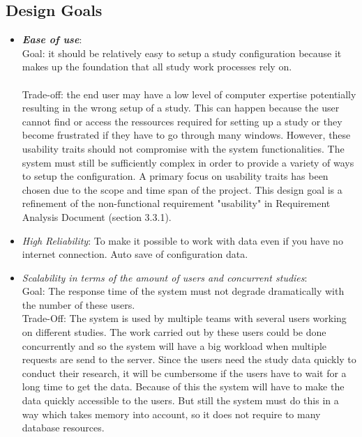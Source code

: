 \subsection{Design Goals}

\begin{itemize}
\item \textit{\bf{Ease of use}}: 
\\
Goal: it should be relatively easy to setup a study configuration because it makes up the foundation that all study work processes rely on. 
\\\\
Trade-off: the end user may have a low level of computer expertise potentially resulting in the wrong setup of a study.  This can happen because the user cannot find or access the ressources required for setting up a study or they become frustrated if they have to go through many windows. However, these usability traits should not compromise with the system functionalities. The system must still be sufficiently complex in order to provide a variety of ways to setup the configuration.  A primary focus on usability traits has been chosen due to the scope and time span of the project. This design goal is a refinement of the non-functional requirement  "usability" in Requirement Analysis Document  (section 3.3.1). 

\item \textit{High Reliability}: To make it possible to work with data even if you have no internet connection. Auto save of configuration data.

\item \textit{Scalability in terms of the amount of users and concurrent studies}:\\
Goal: The response time of the system must not degrade dramatically with the number of these users.\\
Trade-Off: The system is used by multiple teams with several users working on different studies. The work carried out by these users could be done concurrently and so the system will have a big workload when multiple requests are send to the server. Since the users need the study data quickly to conduct their research, it will be cumbersome if the users have to wait for a long time to get the data. Because of this the system will have to make the data quickly accessible to the users. But still the system must do this in a way which takes memory into account, so it does not require to many database resources.


\end{itemize}
